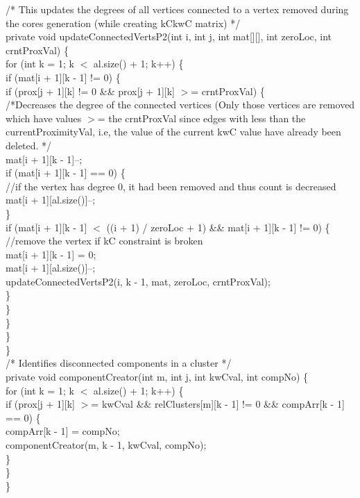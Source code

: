 \begin{ttfamily   }
\begin{scriptsize}
    \noindent /*
      This updates the degrees of all vertices connected
     to a vertex removed during the cores generation (while
      creating kCkwC  matrix)
     */\\
    private void updateConnectedVertsP2(int i, int j, int mat[][], int zeroLoc, int crntProxVal) \{\\
        \noindent for (int k = 1;   k $<$ al.size() + 1;   k++) \{\\
            if (mat[i + 1][k - 1] != 0) \{\\
                if (prox[j + 1][k] != 0 \&\& prox[j + 1][k] $>$= crntProxVal) \{\\
                    \noindent /*Decreases the degree of the connected vertices (Only those
                    vertices are removed which have values $>$= the crntProxVal since
                    edges with less than the currentProximityVal, i.e, the value of the current kwC value
                    have already been deleted.
                     */\\
                    mat[i + 1][k - 1]--;\\
                    if (mat[i + 1][k - 1] == 0) \{\\\noindent//if the vertex has degree 0, it had been removed and thus count is decreased\\
                        mat[i + 1][al.size()]--;\\
                    \}\\
                    if (mat[i + 1][k - 1] $<$ ((i + 1) / zeroLoc + 1) \&\& mat[i + 1][k - 1] != 0) \{\\\noindent//remove the vertex if kC constraint is broken\\
                        mat[i + 1][k - 1] = 0;\\
                        mat[i + 1][al.size()]--;\\
                        updateConnectedVertsP2(i, k - 1, mat, zeroLoc, crntProxVal);\\
                    \}\\
                \}\\
            \}\\
        \}\\
    \}\\

    \noindent /*
      Identifies disconnected components in a cluster
     */\\
    private void componentCreator(int m, int j, int kwCval, int compNo) \{\\
        \noindent for (int k = 1;   k $<$ al.size() + 1;   k++) \{\\
            if (prox[j + 1][k] $>$= kwCval \&\& relClusters[m][k - 1] != 0 \&\& compArr[k - 1] == 0) \{\\
                compArr[k - 1] = compNo;\\
                componentCreator(m, k - 1, kwCval, compNo);\\
            \}\\
        \}\\
    \}\\


\end{scriptsize}
\end{ttfamily   }
